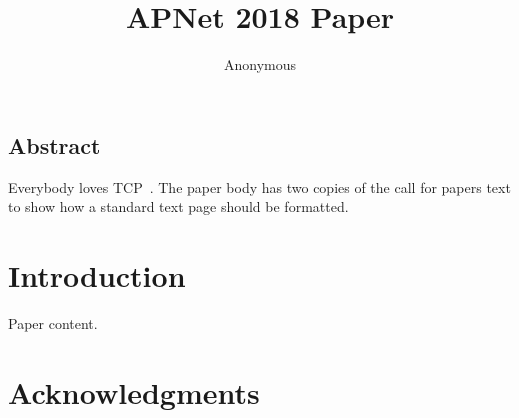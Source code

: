 \documentclass{apnet18}
\begin{document}
 {}
\date{}


\title{APNet 2018 Paper}

\author{Anonymous}

\maketitle


\subsection*{Abstract}

Everybody loves TCP~\cite{vanjacobson}. The paper body has two copies
of the call for papers text to show how a standard text page should be
formatted.

\section{Introduction}

Paper content.

\section*{Acknowledgments}


\begin{small}

\end{small}
\label{last-page}
\end{document}
